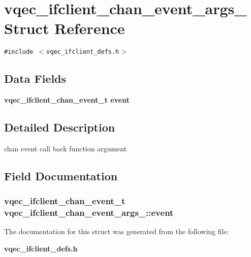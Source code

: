 \section{vqec\_\-ifclient\_\-chan\_\-event\_\-args\_\- Struct Reference}
\label{structvqec__ifclient__chan__event__args__}
{\tt \#include $<$vqec\_\-ifclient\_\-defs.h$>$}

\subsection*{Data Fields}
\begin{CompactItemize}
\item 
\bf{vqec\_\-ifclient\_\-chan\_\-event\_\-t} \bf{event}
\end{CompactItemize}


\subsection{Detailed Description}
chan event call back function argument 



\subsection{Field Documentation}
\subsubsection{\setlength{\rightskip}{0pt plus 5cm}\bf{vqec\_\-ifclient\_\-chan\_\-event\_\-t} \bf{vqec\_\-ifclient\_\-chan\_\-event\_\-args\_\-::event}}\label{structvqec__ifclient__chan__event__args___566126acf77cdc1ed0d85e1caa8cee9a}




The documentation for this struct was generated from the following file:\begin{CompactItemize}
\item 
\bf{vqec\_\-ifclient\_\-defs.h}\end{CompactItemize}
